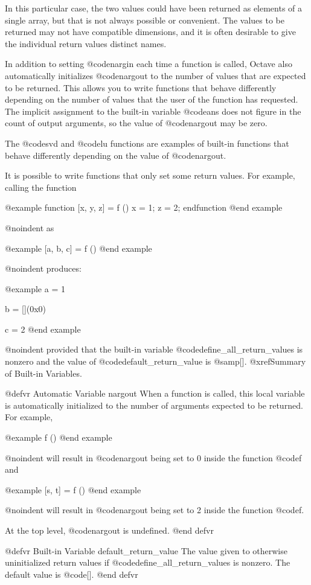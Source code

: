 In this particular case, the two values could have been returned as
elements of a single array, but that is not always possible or
convenient.  The values to be returned may not have compatible
dimensions, and it is often desirable to give the individual return
values distinct names.

In addition to setting @code{nargin} each time a function is called,
Octave also automatically initializes @code{nargout} to the number of
values that are expected to be returned.  This allows you to write
functions that behave differently depending on the number of values that
the user of the function has requested.  The implicit assignment to the
built-in variable @code{ans} does not figure in the count of output
arguments, so the value of @code{nargout} may be zero.

The @code{svd} and @code{lu} functions are examples of built-in
functions that behave differently depending on the value of
@code{nargout}.

It is possible to write functions that only set some return values.  For
example, calling the function

@example
function [x, y, z] = f ()
  x = 1;
  z = 2;
endfunction
@end example

@noindent
as

@example
[a, b, c] = f ()
@end example

@noindent
produces:

@example
a = 1

b = [](0x0)

c = 2
@end example

@noindent
provided that the built-in variable @code{define_all_return_values} is
nonzero and the value of @code{default_return_value} is @samp{[]}.
@xref{Summary of Built-in Variables}.

@defvr {Automatic Variable} nargout
When a function is called, this local variable is automatically
initialized to the number of arguments expected to be returned.  For
example, 

@example
f ()
@end example

@noindent
will result in @code{nargout} being set to 0 inside the function
@code{f} and

@example
[s, t] = f ()
@end example

@noindent
will result in @code{nargout} being set to 2 inside the function
@code{f}.

At the top level, @code{nargout} is undefined.
@end defvr

@defvr {Built-in Variable} default_return_value
The value given to otherwise uninitialized return values if
@code{define_all_return_values} is nonzero.  The default value is
@code{[]}.
@end defvr

